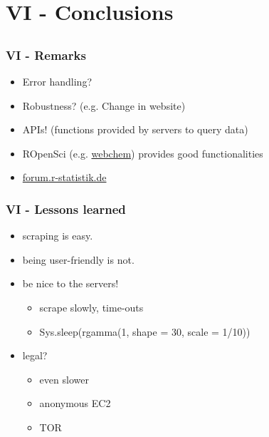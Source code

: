 \documentclass[12pt, t]{beamer}
\begin{document}
\section{VI - Conclusions}
\subsection{}

\begin{frame}
  \frametitle{VI - Remarks}
  \begin{itemize}
  	\item Error handling?
  	\item Robustness? (e.g. Change in website)
  	\item APIs! (functions provided by servers to query data)
  	\item ROpenSci (e.g. \href{https://github.com/ropensci/webchem}{webchem}) provides good functionalities
  	\item \url{forum.r-statistik.de}
  \end{itemize}
\end{frame}

\begin{frame}
  \frametitle{VI - Lessons learned}
  \begin{itemize}
  	\item scraping is easy.
  	\item being user-friendly is \textcolor{hilight}{not}.
  	\item be nice to the servers!
  	\begin{itemize}
  		\item scrape slowly, time-outs
  		\item Sys.sleep(rgamma(1, shape = 30, scale = 1/10))
  	\end{itemize}
  	\item legal?
  	\begin{itemize}
  		\item even slower
  		\item anonymous EC2
  		\item TOR
  	\end{itemize}
  \end{itemize}
\end{frame}
\end{document}
